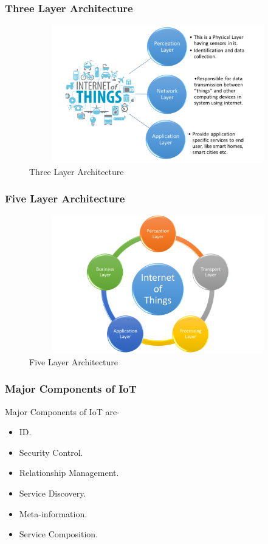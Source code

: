 \documentclass{beamer}
\begin{document}
\begin{frame}
\frametitle{Three Layer Architecture}
\begin{figure}
\centering
\includegraphics[width=12cm,height=6cm]{Picture1}
\caption{Three Layer Architecture}
\end{figure}
\end{frame}
\begin{frame}
\frametitle{Five Layer Architecture}
\begin{figure}
\centering
\includegraphics[width=12cm,height=6cm]{Picture2}
\caption{Five Layer Architecture}
\end{figure}
\end{frame}

\begin{frame}
\frametitle{Major Components of IoT}

Major Components of IoT are- 
\begin{itemize}
	\item ID.
	\item Security Control.
	\item Relationship Management.
	\item Service Discovery.
	\item Meta-information.
	\item Service Composition.
\end{itemize}
\end{frame}
\end{document}
